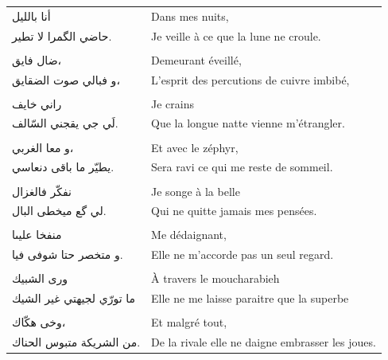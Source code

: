 \pagebreak
\begin{longtable}{R{0.3\textwidth} L{0.65\textwidth}}
\endfirsthead

\textarabic{أنا بالليل}                  &       Dans mes nuits,   \\
\textarabic{حاضي الگمرا لا تطير.}         &       Je veille à ce que la lune ne croule.   \\
\\
\textarabic{ضال فايق،}                   &       Demeurant éveillé,   \\
\textarabic{و فبالي صوت الضقايق،}        &       L’esprit des percutions de cuivre imbibé,   \\
\\
\textarabic{راني خايف}                   &       Je crains   \\
\textarabic{لَي جي يقجني السّالف.}         &       Que la longue natte vienne m’étrangler.   \\
\\
\textarabic{و معا الغربي،}               &       Et avec le zéphyr,   \\
\textarabic{يطيّر ما باقى دنعاسي.}        &       Sera ravi ce qui me reste de sommeil.   \\
\\
\textarabic{نفكّر فالغزال}                &       Je songe à la belle   \\
\textarabic{لي گع ميخطى البال.}          &       Qui ne quitte jamais mes pensées.   \\
\\
\textarabic{منفخا عليىا}                 &       Me dédaignant,   \\
\textarabic{و متخصر حتا شوفى فيا.}       &       Elle ne m’accorde pas un seul regard.   \\
\\
\textarabic{ورى الشبيك}                  &       À travers le moucharabieh   \\
\textarabic{ما تورّي لجيهتي غير الشيك}    &       Elle ne me laisse paraitre que la superbe   \\
\\
\textarabic{وخى هكّاك،}                   &       Et malgré tout,   \\
\textarabic{من الشريكة متبوس الحناك.}    &       De la rivale elle ne daigne embrasser les joues.   \\

\end{longtable}
